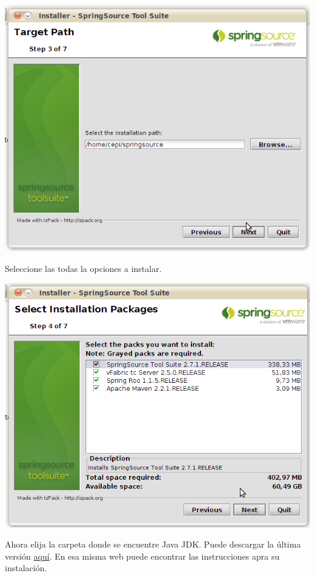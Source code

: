 \documentclass[a4paper,12pt,spanish]{article}
\begin{document}
\begin{center}
\includegraphics[scale=0.45]{ide3}
\end{center}

Seleccione las todas la opciones a instalar.

\begin{center}
\includegraphics[scale=0.45]{ide4}
\end{center}

Ahora elija la carpeta donde se encuentre Java JDK. Puede descargar la última versión \href{http://download.oracle.com/javase/7/docs/webnotes/install/linux/linux-jdk.html}{aquí}. En esa misma web puede encontrar las instrucciones apra su instalación.
\end{document}

